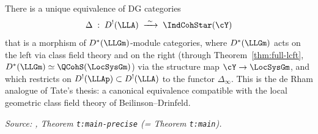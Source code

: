 \begin{theorem}
  \label{thm:main}
  There is a unique equivalence of DG categories
  \[
    \Delta \;:\; D^!(\LLA) \;\xrightarrow{\;\sim\;}\; \IndCohStar(\cY)
  \]
  that is a morphism of $D^*(\LLGm)$-module categories, where $D^*(\LLGm)$
  acts on the left via class field theory and on the right (through
  Theorem~\ref{thm:full-lcft}, $D^*(\LLGm)\simeq\QCohS(\LocSysGm)$) via the
  structure map $\cY \to \LocSysGm$, and which restricts on
  $D^!(\LLAp)\subset D^!(\LLA)$ to the functor $\Delta_\infty$. This is the
  de Rham analogue of Tate's thesis: a canonical equivalence compatible with
  the local geometric class field theory of Beilinson--Drinfeld.

  \textit{Source: \cite{hilburn-raskin}, Theorem \texttt{t:main-precise} (= Theorem \texttt{t:main}).}
\end{theorem}

